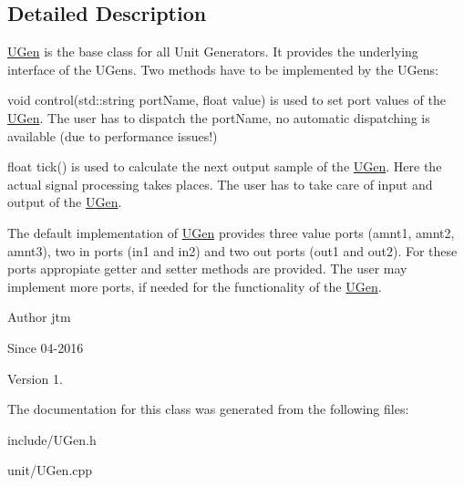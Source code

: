 \subsection{Detailed Description}
\hyperlink{classunit_1_1UGen}{U\+Gen} is the base class for all Unit Generators. It provides the underlying interface of the U\+Gens. Two methods have to be implemented by the U\+Gens\+:

void control(std\+::string port\+Name, float value) is used to set port values of the \hyperlink{classunit_1_1UGen}{U\+Gen}. The user has to dispatch the port\+Name, no automatic dispatching is available (due to performance issues!)

float tick() is used to calculate the next output sample of the \hyperlink{classunit_1_1UGen}{U\+Gen}. Here the actual signal processing takes places. The user has to take care of input and output of the \hyperlink{classunit_1_1UGen}{U\+Gen}.

The default implementation of \hyperlink{classunit_1_1UGen}{U\+Gen} provides three value ports (amnt1, amnt2, amnt3), two in ports (in1 and in2) and two out ports (out1 and out2). For these ports appropiate getter and setter methods are provided. The user may implement more ports, if needed for the functionality of the \hyperlink{classunit_1_1UGen}{U\+Gen}.

\begin{DoxyAuthor}{Author}
jtm 
\end{DoxyAuthor}
\begin{DoxySince}{Since}
04-\/2016 
\end{DoxySince}
\begin{DoxyVersion}{Version}
1. 
\end{DoxyVersion}


The documentation for this class was generated from the following files\+:\begin{DoxyCompactItemize}
\item 
include/U\+Gen.\+h\item 
unit/U\+Gen.\+cpp\end{DoxyCompactItemize}
